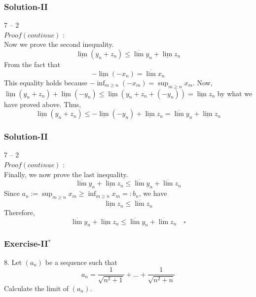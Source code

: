 \documentclass[12pt, t]{beamer}
\begin{document}
\begin{frame}
    \frametitle{Solution-II}
7 -- 2\\
$Proof(continue)$ : \\
\hspace{1em} Now we prove the second inequality.
\begin{equation*}
    \underline{\lim} (y_n+z_n)\leq\overline{\lim}y_n+\underline{\lim}z_n
\end{equation*}
\hspace{1em} From the fact that 
\begin{equation*}
    -\underline{\lim}(-x_n)=\overline{\lim}x_n
\end{equation*}
\hspace{1em} This equality holds because $-\inf_{m\geq n}(-x_m)=\sup_{m\geq n}x_m$. Now, 
$\underline{\lim}(y_n+z_n)+\underline{\lim}(-y_n)\leq \underline{\lim}(y_n+z_n+(-y_n))=\underline{\lim}z_n$ 
by what we have proved above. Thus, 
\begin{equation*}
    \underline{\lim}(y_n+z_n)\leq -\underline{\lim}(-y_n)+\underline{\lim}z_n=\overline{\lim}y_n+\underline{\lim}z_n
\end{equation*}

\end{frame}


\begin{frame}
    \frametitle{Solution-II}
7 -- 2\\
$Proof(continue)$ : \\
\hspace{1em} Finally, we now prove the last inequality.
\begin{equation*}
    \overline{\lim}y_n+\underline{\lim}z_n\leq\overline{\lim}y_n+\overline{\lim}z_n
\end{equation*}
\hspace{1em} Since $a_n:=\sup_{m\geq n}x_m\geq \inf_{m\geq n}x_m=:b_n$, we have
\begin{equation*}
    \underline{\lim}z_n\leq \overline{\lim}z_n
\end{equation*}
\hspace{1em} Therefore, 
\begin{equation*}
    \overline{\lim}y_n+\underline{\lim}z_n\leq\overline{\lim}y_n+\overline{\lim}z_n \quad \square
\end{equation*}

\end{frame}




\begin{frame}
    \frametitle{Exercise-II$^*$}
8. Let $(a_n)$ be a sequence such that 
\begin{equation*}
    a_n=\frac{1}{\sqrt{n^2+1}}+\dots+\frac{1}{\sqrt{n^2+n}}
\end{equation*}
Calculate the limit of $(a_n)$.
\end{frame}
\end{document}
